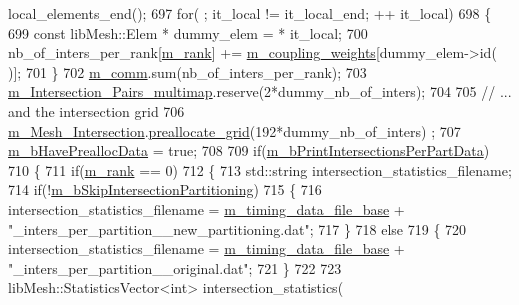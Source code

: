 \begin{DoxyCode}
      local\_elements\_end();
697             \textcolor{keywordflow}{for}( ; it\_local != it\_local\_end; ++ it\_local)
698             \{
699                 \textcolor{keyword}{const} libMesh::Elem * dummy\_elem = * it\_local;
700                 nb\_of\_inters\_per\_rank[\hyperlink{classcarl_1_1_intersection___search_a82564dfb7815673fcb9d9e3eb2d03b97}{m\_rank}] += \hyperlink{classcarl_1_1_intersection___search_a1d44cfde49ae719c406da8bd5c463992}{m\_coupling\_weights}[dummy\_elem->id(
      )];
701             \}
702             \hyperlink{classcarl_1_1_intersection___search_a69fe381ecd45f4cdcb4810294aa88eaa}{m\_comm}.sum(nb\_of\_inters\_per\_rank);
703             \hyperlink{classcarl_1_1_intersection___search_a21bb47bfa3021d18b718919ad4a245d7}{m\_Intersection\_Pairs\_multimap}.reserve(2*dummy\_nb\_of\_inters);
704 
705             \textcolor{comment}{// ... and the intersection grid}
706             \hyperlink{classcarl_1_1_intersection___search_a4946b764d66e3f26f323c5d043551c66}{m\_Mesh\_Intersection}.\hyperlink{classcarl_1_1_mesh___intersection_aee962f4dc634b4187cb759d6bf022d40}{preallocate\_grid}(192*dummy\_nb\_of\_inters)
      ;
707             \hyperlink{classcarl_1_1_intersection___search_ac3eae683cb64b5bd8b7c0430d6e7496f}{m\_bHavePreallocData} = \textcolor{keyword}{true};
708 
709             \textcolor{keywordflow}{if}(\hyperlink{classcarl_1_1_intersection___search_a32e74e1f2aaaf5630b57091d01e5932b}{m\_bPrintIntersectionsPerPartData})
710             \{
711                 \textcolor{keywordflow}{if}(\hyperlink{classcarl_1_1_intersection___search_a82564dfb7815673fcb9d9e3eb2d03b97}{m\_rank} == 0)
712                 \{
713                     std::string intersection\_statistics\_filename;
714                     \textcolor{keywordflow}{if}(!\hyperlink{classcarl_1_1_intersection___search_aab4276c3ba5b247b46300de675a10cb4}{m\_bSkipIntersectionPartitioning})
715                     \{
716                         intersection\_statistics\_filename = 
      \hyperlink{classcarl_1_1_intersection___search_aea1aa01a86b5cdb7bea5ac9e7f73105f}{m\_timing\_data\_file\_base} + \textcolor{stringliteral}{"\_inters\_per\_partition\_\_new\_partitioning.dat"};
717                     \}
718                     \textcolor{keywordflow}{else}
719                     \{
720                         intersection\_statistics\_filename = 
      \hyperlink{classcarl_1_1_intersection___search_aea1aa01a86b5cdb7bea5ac9e7f73105f}{m\_timing\_data\_file\_base} + \textcolor{stringliteral}{"\_inters\_per\_partition\_\_original.dat"};
721                     \}
722 
723                     libMesh::StatisticsVector<int> intersection\_statistics(

\end{DoxyCode}
